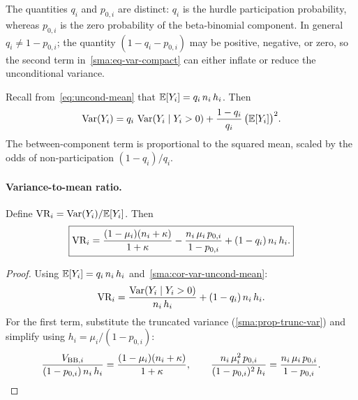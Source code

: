 \begin{remark}\label{sma:rem-qi-vs-p0}
The quantities $q_i$ and $p_{0,i}$ are distinct: $q_i$ is the hurdle
participation probability, whereas $p_{0,i}$ is the zero probability of the
beta-binomial component. In general
$q_i \neq 1 - p_{0,i}$; the quantity $(1 - q_i - p_{0,i})$ may be positive,
negative, or zero, so the second term in~\eqref{sma:eq-var-compact} can
either inflate or reduce the unconditional variance.
\end{remark}

\begin{corollary}
\label{sma:cor-var-uncond-mean}
Recall from~\eqref{eq:uncond-mean} that $\mathbb{E}[Y_i] = q_i\,n_i\,h_i$. Then
\begin{equation}\label{sma:eq-var-uncond-mean}
  \operatorname*{Var}(Y_i)
  = q_i\,\operatorname*{Var}(Y_i \mid Y_i > 0)
    + \frac{1-q_i}{q_i}\,\bigl(\mathbb{E}[Y_i]\bigr)^2.
\end{equation}
The between-component term is proportional to the squared mean, scaled by
the odds of non-participation $(1-q_i)/q_i$.
\end{corollary}


\paragraph{Variance-to-mean ratio.}

\begin{proposition}\label{sma:prop-VR}
Define $\textup{VR}_i = \operatorname*{Var}(Y_i)/\mathbb{E}[Y_i]$.  Then
\begin{equation}\label{sma:eq-VR}
  \boxed{
    \textup{VR}_i
    = \frac{(1-\mu_i)(n_i+\kappa)}{1+\kappa}
      - \frac{n_i\,\mu_i\,p_{0,i}}{1-p_{0,i}}
      + (1-q_i)\,n_i\,h_i.
  }
\end{equation}
\end{proposition}

\begin{proof}
Using $\mathbb{E}[Y_i] = q_i\,n_i\,h_i$ and~\cref{sma:cor-var-uncond-mean}:
\[
  \textup{VR}_i
  = \frac{\operatorname*{Var}(Y_i \mid Y_i > 0)}{n_i\,h_i}
    + (1-q_i)\,n_i\,h_i.
\]
For the first term, substitute the truncated variance
(\cref{sma:prop-trunc-var}) and simplify using
$h_i = \mu_i/(1-p_{0,i})$:
\[
  \frac{V_{\textup{BB},i}}{(1-p_{0,i})\,n_i\,h_i}
  = \frac{(1-\mu_i)(n_i+\kappa)}{1+\kappa},
  \qquad
  \frac{n_i\,\mu_i^2\,p_{0,i}}{(1-p_{0,i})^2\,h_i}
  = \frac{n_i\,\mu_i\,p_{0,i}}{1-p_{0,i}}. \qedhere
\]
\end{proof}

